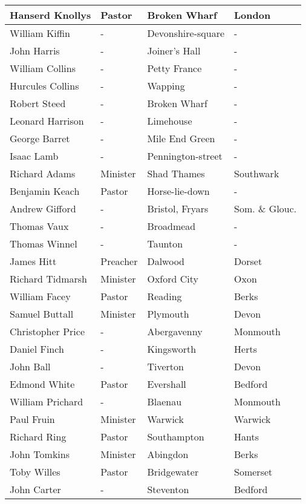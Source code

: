 \documentclass[12pt,a4paper]{book}
\begin{document}
\begin{tabularx}{\textwidth}{|l|l|l|l|}
\toprule
Hanserd Knollys & Pastor & Broken Wharf & London\\
\midrule
William Kiffin & - & Devonshire-square & -\\
\midrule
John Harris & - & Joiner's Hall & -\\
\midrule
William Collins & - & Petty France & -\\
\midrule
Hurcules Collins & - & Wapping & -\\
\midrule
Robert Steed & - & Broken Wharf & -\\
\midrule
Leonard Harrison & - & Limehouse & -\\
\midrule
George Barret & - & Mile End Green & -\\
\midrule
Isaac Lamb & - & Pennington-street & -\\
\midrule
Richard Adams & Minister & Shad Thames & Southwark\\
\midrule
Benjamin Keach & Pastor & Horse-lie-down & -\\
\midrule
Andrew Gifford & - & Bristol, Fryars & Som. \& Glouc.\\
\midrule
Thomas Vaux & - & Broadmead & -\\
\midrule
Thomas Winnel & - & Taunton & -\\
\midrule
James Hitt & Preacher & Dalwood & Dorset\\
\midrule
Richard Tidmarsh & Minister & Oxford City & Oxon\\
\midrule
William Facey & Pastor & Reading & Berks\\
\midrule
Samuel Buttall & Minister & Plymouth & Devon\\
\midrule
Christopher Price & - & Abergavenny & Monmouth\\
\midrule
Daniel Finch & - & Kingsworth & Herts\\
\midrule
John Ball & - & Tiverton & Devon\\
\midrule
Edmond White & Pastor & Evershall & Bedford\\
\midrule
William Prichard & - & Blaenau & Monmouth\\
\midrule
Paul Fruin & Minister & Warwick & Warwick\\
\midrule
Richard Ring & Pastor & Southampton & Hants\\
\midrule
John Tomkins & Minister & Abingdon & Berks\\
\midrule
Toby Willes & Pastor & Bridgewater & Somerset\\
\midrule
John Carter & - & Steventon & Bedford\\

\end{tabularx}
\end{document}

